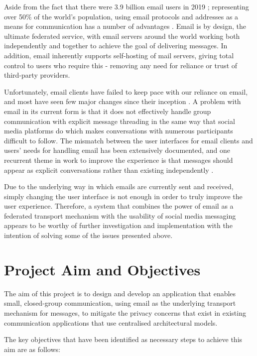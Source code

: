 Aside from the fact that there were 3.9 billion email users in 2019 \cite{radicati2019}; representing over 50\% of the world's population, using email protocols and addresses as a means for communication has a number of advantages \cite{hanson2011}. Email is by design, the ultimate federated service, with email servers around the world working both independently and together to achieve the goal of delivering messages. In addition, email inherently supports self-hosting of mail servers, giving total control to users who require this - removing any need for reliance or trust of third-party providers.

Unfortunately, email clients have failed to keep pace with our reliance on email, and most have seen few major changes since their inception \cite{rohall2004}. A problem with email in its current form is that it does not effectively handle group communication with explicit message threading in the same way that social media platforms do which makes conversations with numerous participants difficult to follow. The mismatch between the user interfaces for email clients and users' needs for handling email has been extensively documented, and one recurrent theme in work to improve the experience is that messages should appear as explicit conversations rather than existing independently \cite{venolia2003}.

Due to the underlying way in which emails are currently sent and received, simply changing the user interface is not enough in order to truly improve the user experience. Therefore, a system that combines the power of email as a federated transport mechanism with the usability of social media messaging appears to be worthy of further investigation and implementation with the intention of solving some of the issues presented above. 

\section{Project Aim and Objectives}

The aim of this project is to design and develop an application that enables small, closed-group communication, using email as the underlying transport mechanism for messages, to mitigate the privacy concerns that exist in existing communication applications that use centralised architectural models.

The key objectives that have been identified as necessary steps to achieve this aim are as follows:

